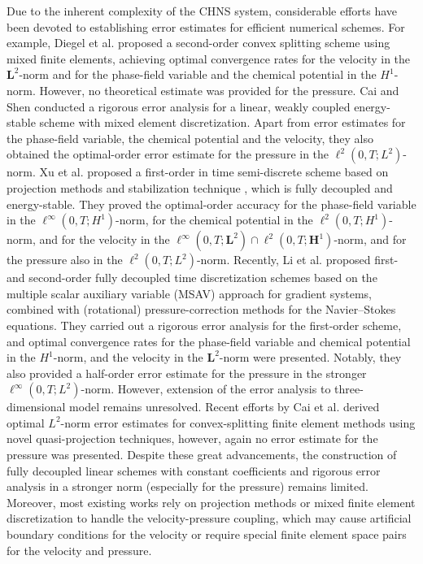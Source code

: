 Due to the inherent complexity of the CHNS system, considerable efforts have been devoted to establishing error estimates for efficient numerical schemes. For example, Diegel et al. \cite{diegel2017convergence} proposed a second-order convex splitting scheme using mixed finite elements, achieving optimal convergence rates for the velocity in the $\bm L^2$-norm and for the phase-field variable and the chemical potential in the $ H^1$-norm. However, no theoretical estimate was provided for the pressure. Cai and Shen \cite{cai2018error} conducted a rigorous error analysis for a linear, weakly coupled energy-stable scheme with mixed element discretization. Apart from error estimates for the phase-field variable, the chemical potential and the velocity, they also obtained the optimal-order error estimate for the pressure in the $\ell^2(0,T; L^2)$-norm. Xu et al. \cite{xu2020error} proposed a first-order in time semi-discrete scheme based on projection methods \cite{goda1979multistep}  and stabilization technique \cite{shen2010numerical}, which is fully decoupled and energy-stable. 
They proved the optimal-order accuracy for the phase-field variable in the $\ell^\infty(0,T;H^1)$-norm, for the chemical potential in the $\ell^2(0,T;H^1)$-norm, and for the velocity in the $\ell^\infty(0,T; \bm L^2) \cap \ell^2(0,T; \bm H^1)$-norm, and for the pressure also in the $\ell^2(0,T; L^2)$-norm. Recently, Li et al. \cite{li2022fully} proposed first- and second-order fully decoupled time discretization schemes based on the multiple scalar auxiliary variable (MSAV) approach for gradient systems, combined with (rotational) pressure-correction methods \cite{goda1979multistep,guermond2006overview} for the Navier--Stokes equations. They carried out a rigorous error analysis for the first-order scheme, and optimal convergence rates for the phase-field variable and chemical potential in the $H^1$-norm, and the velocity in the $\bm L^2$-norm were presented. Notably, they also provided a half-order error estimate for the pressure in the stronger $\ell^\infty(0,T; L^2)$-norm. However, extension of the error analysis to three-dimensional model remains unresolved.
Recent efforts by Cai et al. \cite{cai2023optimal} derived optimal $L^2$-norm error estimates for convex-splitting finite element methods using novel quasi-projection techniques, however, again no error estimate for the pressure was presented. Despite these great advancements, the construction of fully decoupled linear schemes with constant coefficients and rigorous error analysis in a stronger norm (especially for the pressure) remains limited. Moreover, most existing works rely on projection methods or mixed finite element discretization to handle the velocity-pressure coupling, which may cause artificial boundary conditions for the velocity or require special finite element space pairs for the velocity and pressure.

